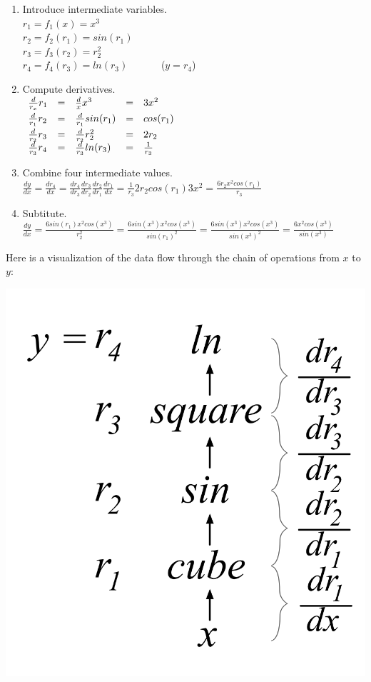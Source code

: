\documentclass[11pt]{article}
\begin{document}
\begin{enumerate}
	\item Introduce intermediate variables.\\
$r_1 = f_1(x) = x^3$\\
$r_2 = f_2(r_1) = sin(r_1)$\\
$r_3 = f_3(r_2) = r_2^2$\\
$r_4 = f_4(r_3) = ln(r_3)$ ~~~~~~($y = r_4$)
	\item Compute derivatives.\\
$\begin{array}{lllll}
\vspace{1mm}
\frac{d}{r_x} r_1 & = & \frac{d}{x} x^3 & = & 3x^2\\
\vspace{1mm}
\frac{d}{r_1} r_2 & = & \frac{d}{r_1} sin(r_1) & = & cos(r_1) \\
\frac{d}{r_2} r_3 & = & \frac{d}{r_2} r_2^2 & =& 2r_2\\
\frac{d}{r_3} r_4 & = & \frac{d}{r_3} ln(r_3) & =& \frac{1}{r_3}\\
\end{array}$
	\item Combine four intermediate values.\\
$\frac{dy}{dx} = \frac{d r_4}{dx} = \frac{d r_4}{dr_3}\frac{dr_3}{d r_2} \frac{dr_2}{dr_1} \frac{dr_1}{dx} = \frac{1}{r_3}  2r_2  cos(r_1)  3x^2 = \frac{6r_2x^2cos(r_1)}{r_3}$
	\item Subtitute.\\
$\frac{dy}{dx} = \frac{6sin(r_1)x^2cos(x^3)}{r_2^2} = \frac{6sin(x^3)x^2cos(x^3)}{sin(r_1)^2} = \frac{6sin(x^3)x^2cos(x^3)}{sin(x^3)^2} = \frac{6x^2cos(x^3)}{sin(x^3)}$
\end{enumerate}


Here is a visualization of the data flow through the chain of operations from $x$ to $y$:

\includegraphics[scale=.9]{chain-tree.png}
\end{document}
